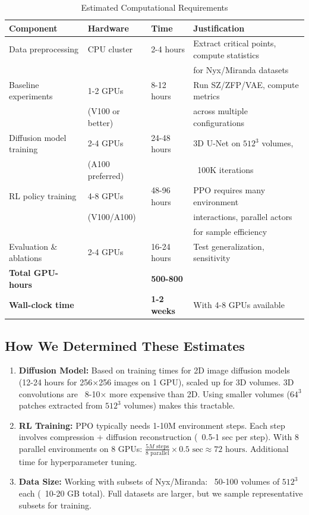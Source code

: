 \documentclass[11pt]{article}
\begin{document}
\begin{table}[h]
\centering
\caption{Estimated Computational Requirements}
\begin{tabular}{@{}llll@{}}
\toprule
\textbf{Component} & \textbf{Hardware} & \textbf{Time} & \textbf{Justification} \\ \midrule
Data preprocessing & CPU cluster & 2-4 hours & Extract critical points, compute statistics \\
& & & for Nyx/Miranda datasets \\ \midrule
Baseline experiments & 1-2 GPUs & 8-12 hours & Run SZ/ZFP/VAE, compute metrics \\
& (V100 or better) & & across multiple configurations \\ \midrule
Diffusion model training & 2-4 GPUs & 24-48 hours & 3D U-Net on $512^3$ volumes, \\
& (A100 preferred) & & ~100K iterations \\ \midrule
RL policy training & 4-8 GPUs & 48-96 hours & PPO requires many environment \\
& (V100/A100) & & interactions, parallel actors \\
& & & for sample efficiency \\ \midrule
Evaluation \& ablations & 2-4 GPUs & 16-24 hours & Test generalization, sensitivity \\ \midrule
\textbf{Total GPU-hours} & & \textbf{500-800} & \multicolumn{1}{l}{} \\
\textbf{Wall-clock time} & & \textbf{1-2 weeks} & \multicolumn{1}{l}{With 4-8 GPUs available} \\ \bottomrule
\end{tabular}
\end{table}

\subsection{How We Determined These Estimates}

\begin{enumerate}
    \item \textbf{Diffusion Model:} Based on training times for 2D image diffusion models (12-24 hours for 256$\times$256 images on 1 GPU), scaled up for 3D volumes. 3D convolutions are ~8-10$\times$ more expensive than 2D. Using smaller volumes ($64^3$ patches extracted from $512^3$ volumes) makes this tractable.

    \item \textbf{RL Training:} PPO typically needs 1-10M environment steps. Each step involves compression + diffusion reconstruction (~0.5-1 sec per step). With 8 parallel environments on 8 GPUs: $\frac{5M \text{ steps}}{8 \text{ parallel}} \times 0.5 \text{ sec} \approx 72 \text{ hours}$. Additional time for hyperparameter tuning.

    \item \textbf{Data Size:} Working with subsets of Nyx/Miranda: ~50-100 volumes of $512^3$ each (~10-20 GB total). Full datasets are larger, but we sample representative subsets for training.
\end{enumerate}
\end{document}

